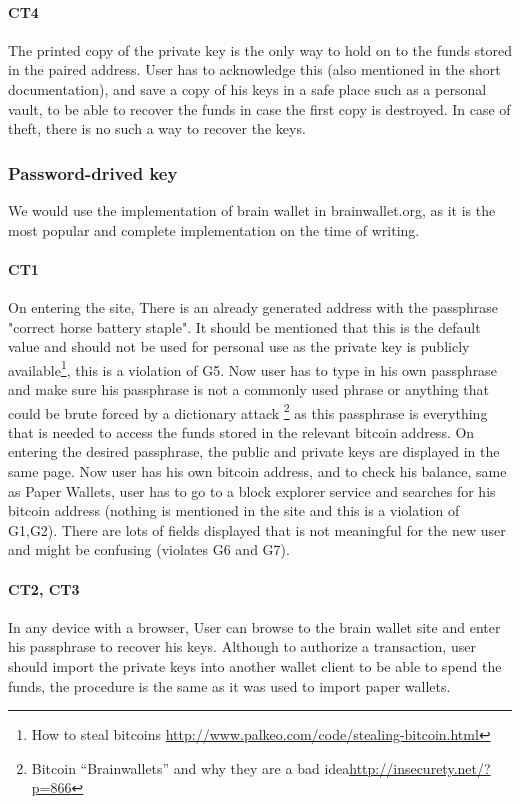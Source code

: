 \paragraph{CT4} The printed copy of the private key is the only way to hold on to the funds stored in the paired address. User has to acknowledge this (also mentioned in the short documentation), and save a copy of his keys in a safe place such as a personal vault, to be able to recover the funds in case the first copy is destroyed. In case of theft, there is no such a way to recover the keys.


\subsubsection{Password-drived key} We would use the implementation of brain wallet in brainwallet.org, as it is the most popular and complete implementation on the time of writing.

\paragraph{CT1} On entering the site, There is an already generated address with the passphrase "correct horse battery staple". It should be mentioned that this is the default value and should not be used for personal use as the private key is publicly available\footnote{How to steal bitcoins \url{http://www.palkeo.com/code/stealing-bitcoin.html}}, this is a violation of G5. Now user has to type in his own passphrase and make sure his passphrase is not a commonly used phrase or anything that could be brute forced by a dictionary attack \footnote{Bitcoin “Brainwallets” and why they are a bad idea\url{http://insecurety.net/?p=866}} as this passphrase is everything that is needed to access the funds stored in the relevant bitcoin address. On entering the desired passphrase, the public and private keys are displayed in the same page. Now user has his own bitcoin address, and to check his balance, same as Paper Wallets, user has to go to a block explorer service and searches for his bitcoin address (nothing is mentioned in the site and this is a violation of G1,G2). There are lots of fields displayed that is not meaningful for the new user and might be confusing (violates G6 and G7).

\paragraph{CT2, CT3} In any device with a browser, User can browse to the brain wallet site and enter his passphrase to recover his keys. Although to authorize a transaction, user should import the private keys into another wallet client to be able to spend the funds, the procedure is the same as it was used to import paper wallets.

